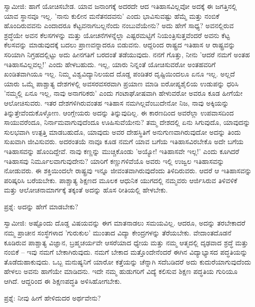 ಸ್ವಾಮೀಜಿ: ಹಾಗೆ ಯೋಚಿಸಬೇಡ. ಯಾವ ಜನಾಂಗಕ್ಕೆ ಅದರದೇ ಆದ ಇತಿಹಾಸವಿಲ್ಲವೋ ಅದಕ್ಕೆ ಈ ಜಗತ್ತಿನಲ್ಲಿ ಯಾವ ಸ್ಥಾನವೂ ಇಲ್ಲ. 'ನಾನು ಕುಲೀನ ಮನೆತನದವನು' ಎಂದು ಭಾವಿಸುವಷ್ಟು ಹೆಮ್ಮೆ ಮತ್ತು ನಂಬಿಕೆ ಹೊಂದಿರುವವನು ಎಂದಾದರೂ ಕೆಟ್ಟವನಾಗಬಲ್ಲನೆಂದು ನಂಬುವೆಯೇನು? ಅದು ಹೇಗೆ ಸಾಧ್ಯ? ಅವನಲ್ಲಿರುವ ಶ್ರದ್ಧೆಯೇ ಅವನ ಕೆಲಸಗಳನ್ನು ಮತ್ತು ಯೋಚನೆಗಳನ್ನೆಲ್ಲಾ ಎಷ್ಟರಮಟ್ಟಿಗೆ ನಿಯಂತ್ರಿಸುತ್ತವೆಂದರೆ ಅವನು ಕೆಟ್ಟ ಕೆಲಸವನ್ನು ಮಾಡುವುದಕ್ಕೆ ಬದಲು ಪ್ರಾಣವನ್ನಾದರೂ ಬಿಡುವನು. ಆದ್ದರಿಂದ ರಾಷ್ಟ್ರದ ಇತಿಹಾಸ ಆ ರಾಷ್ಟ್ರವನ್ನು ಸರಿಯಾಗಿ ನಿಗ್ರಹದಲ್ಲಿಟ್ಟು ಅದು ಹೀನಗತಿಗೆ ಬರದಂತೆ ತಡೆಯುವುದು. ನನಗೆ ಗೊತ್ತು, ನೀನು 'ಆದರೆ ನಮಗೆ ಅಂತಹ ಇತಿಹಾಸವಿಲ್ಲವಲ್ಲ!' ಎಂದು ಹೇಳಬಹುದು. ಇಲ್ಲ, ಯಾರು ನಿನ್ನಂತೆ ಯೋಚಿಸುವರೋ ಅಂತಹವರಿಗೆ ಖಂಡಿತವಾಗಿಯೂ ಇಲ್ಲ. ನಿಮ್ಮ ವಿಶ್ವವಿದ್ಯಾನಿಲಯದ ದೊಡ್ಡ ಪಂಡಿತರ ದೃಷ್ಟಿಯಿಂದಲೂ ಏನೂ ಇಲ್ಲ. ಅಲ್ಲದೆ ಯಾರು ಒಮ್ಮೆ ಪಾಶ್ಚಾತ್ಯ ದೇಶಗಳಲ್ಲಿ ಅವಸರವಸರವಾಗಿ ಪ್ರಯಾಣ ಮಾಡಿ ಐರೋಪ್ಯಶೈಲಿಯ ಉಡುಪನ್ನು ಧರಿಸಿ 'ನಮ್ಮಲ್ಲಿ ಏನೂ ಇಲ್ಲ, ನಾವು ಅನಾಗರಿಕರು' ಎಂದು ಗಂಟಾಘೋಷವಾಗಿ ಹೇಳುವರೋ ಅವರೂ ಕೂಡ ಹೀಗೆಯೇ ಆಲೋಚಿಸುವರು. ಇತರ ದೇಶಗಳಿಗಿರುವಂತಹ ಇತಿಹಾಸ ನಮಗಿಲ್ಲವೆಂಬುದೇನೋ ನಿಜ, ನಾವು ಅಕ್ಕಿಯನ್ನು ತಿನ್ನುತ್ತೇವೆಂದುಕೊಳ್ಳೋಣ. ಆಂಗ್ಲೇಯರು ಅದನ್ನು ತಿನ್ನುವುದಿಲ್ಲ. ಈ ಕಾರಣದಿಂದ ಅವರೆಲ್ಲಾ ಉಪವಾಸದಿಂದ ಸಾಯುವರೆಂದೂ, ನಿರ್ನಾಮವಾಗುವುದೆಂದೂ ಊಹಿಸುವೆಯೇನು? ತಮ್ಮ ದೇಶದಲ್ಲಿ ಏನು ಸಿಗುವುದೊ, ಯಾವುದನ್ನು ಸುಲಭವಾಗಿ ಉತ್ಪತ್ತಿ ಮಾಡಬಹುದೊ, ಯಾವುದು ಅವರ ದೇಹಸ್ಥಿತಿಗೆ ಅನುಗುಣವಾಗಿರುವುದೋ ಅದನ್ನು ತಿಂದು ಸುಖವಾಗಿ ಜೀವಿಸುವರು. ಅದರಂತಯೆ ನಾವೂ ಕೂಡ ನಮಗೆ ಯಾವ ಬಗೆಯ ಇತಿಹಾಸವಿರಬೇಕೊ ಅದೇ ಬಗೆಯ ಇತಿಹಾಸವನ್ನು ಹೊಂದಿದ್ದೇವೆ. ನಾವು ಕಣ್ಣನ್ನು ಮುಚ್ಚಿಕೊಂಡು 'ಅಯ್ಯೋ! ಇತಿಹಾಸವೇ ಇಲ್ಲ!' ಎಂದು ಕೂಗಿದರೆ ಇತಿಹಾಸವು ನಿರ್ಮೂಲವಾಗುವುದೇನು? ಯಾರಿಗೆ ಕಣ್ಣುಗಳಿವೆಯೊ ಅವರು ಇಲ್ಲಿ ಉಜ್ವಲ ಇತಿಹಾಸವನ್ನು ನೋಡುವರು. ಈ ಶಕ್ತಿಯಿಂದಲೇ ರಾಷ್ಟ್ರವು ಇನ್ನೂ ಜೀವಂತವಾಗಿರುವುದೆಂದು ತಿಳಿದಿರುವರು. ಆದರೆ ಆ ಇತಿಹಾಸವನ್ನು ಪರಿಷ್ಕರಿಸಿ ಬರೆಯಬೇಕು. ಪಾಶ್ಚಾತ್ಯ ಶಿಕ್ಷಣದ ಮೂಲಕ ಆಧುನಿಕ ಯುಗದಲ್ಲಿ ನಮ್ಮವರು ಆರ್ಜಿಸಿರುವ ತಿಳಿವಳಿಕೆ ಮತ್ತು ಆಲೋಚನಾಮಾರ್ಗಕ್ಕೆ ತಕ್ಕಂತೆ ಅದನ್ನು ಹೊಸ ರೀತಿಯಲ್ಲಿ ಹೇಳಬೇಕು.

ಪ್ರಶ್ನೆ: ಅದನ್ನು ಹೇಗೆ ಮಾಡಬೇಕು?

ಸ್ವಾಮೀಜಿ: ಅಷ್ಟೊಂದು ದೊಡ್ಡ ವಿಷಯವನ್ನು ಈಗ ಮಾತನಾಡಲು ಸಮಯವಿಲ್ಲ. ಆದರೂ, ಅದನ್ನು ತರಬೇಕಾದರೆ ನಮ್ಮ ಪ್ರಾಚೀನ ಸಂಸ್ಥೆಗಳಾದ 'ಗುರುಕುಲ' ಮುಂತಾದ ವಿದ್ಯಾ ಕೇಂದ್ರಗಳನ್ನು ತೆರೆಯಬೇಕು. ವೇದಾಂತದೊಡನೆ ಕೂಡಿರುವ ಪಾಶ್ಚಾತ್ಯ ವಿಜ್ಞಾನ, ಬ್ರಹ್ಮಚರ್ಯವೇ ಆಸರೆಯಾದ ಧ್ಯೇಯ ಮತ್ತು ನಮ್ಮ ಆತ್ಮದಲ್ಲಿ ದೃಢವಾದ ಶ್ರದ್ಧೆ ಮತ್ತು ನಂಬಿಕೆ – ಇವು ನಮಗೆ ಬೇಕಾಗಿರುವುದು. ನಮಗೆ ಬೇಕಾದ ಮತ್ತೊಂದೇನೆಂದರೆ ಈಗಿನ ವಿದ್ಯಾಭ್ಯಾಸದ ಪದ್ಧತಿಯನ್ನು ತೊಡೆದುಹಾಕುವುದು. ಒಬ್ಬ ಮನುಷ್ಯನಿಗೆ ಯಾರೋ ಕತ್ತೆಯನ್ನು ಚೆನ್ನಾಗಿ ಸದೆಬಡಿದರೆ ಅದು ಕುದುರೆಯಾಗುವುದೆಂದು ಹೇಳಲು ಅವನು ಹಾಗೆಯೇ ಮಾಡಿದನು. ಇದೇ ನಮ್ಮ ಹುಡುಗರಿಗೆ ವಿದ್ಯೆ ಕಲಿಸುವ ಶಿಕ್ಷಣ ಪದ್ಧತಿಯ ಗುರಿಯೂ ಆಗಿದೆ. ಆದ್ದರಿಂದ ಈ ಶಿಕ್ಷಣಪದ್ಧತಿ ಅಳಿಸಿಹೋಗಬೇಕು.

ಪ್ರಶ್ನೆ: ನೀವು ಹೀಗೆ ಹೇಳಿದುದರ ಅರ್ಥವೇನು?

